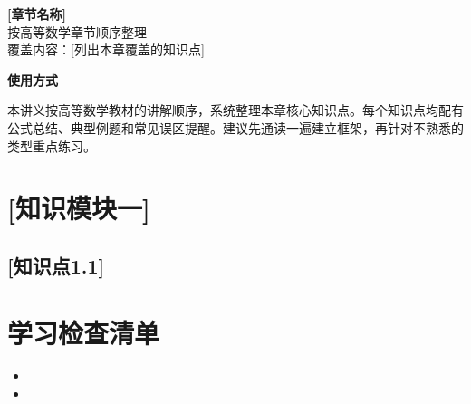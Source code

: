 \documentclass[UTF8,10pt]{ctexart}
\newcommand{\warning}[1]{\textbf{\color{warn}#1}}
\newenvironment{studybox}[1]
{\par\medskip\noindent\colorbox{softblue}{\parbox{\dimexpr\linewidth-2\fboxsep}{\textbf{\color{mainblue}#1}}}\par\smallskip}
{\par\medskip}
\begin{document}
\begin{center}
  {\LARGE\bfseries [章节名称]}\\[6pt]
  {\large 按高等数学章节顺序整理}\\[4pt]
  {\normalsize 覆盖内容：[列出本章覆盖的知识点]}
\end{center}

\begin{studybox}{使用方式}
本讲义按高等数学教材的讲解顺序，系统整理本章核心知识点。每个知识点均配有公式总结、典型例题和常见误区提醒。建议先通读一遍建立框架，再针对不熟悉的类型重点练习。
\end{studybox}


\section{[知识模块一]}

\subsection{[知识点1.1]}


\section{学习检查清单}
\begin{itemize}
  \item [自检项1]
  \item [自检项2]
\end{itemize}
\end{document}
